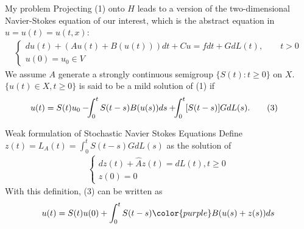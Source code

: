 \documentclass[xcolor=dvipsnames,leqno]{beamer}
\begin{document}
\begin{frame}{My problem}  
Projecting (1) onto $H$ leads to a version of the two-dimensional Navier-Stokes equation of our interest, which is the abstract equation in $u=u(t)=u(t,x)$:
	\begin{align*}\tag{2}%
			\begin{cases}
		        du(t)+(Au(t)+B(u(t)))dt+Cu=fdt+GdL(t), \qquad t>0\\
				u(0)=u_0\in V%
			\end{cases}
	\end{align*}  
We assume $A$ generate a strongly continuous semigroup $\{S(t): t\geq 0\}$ on $X$.  $\{u(t)\in X,t\geq 0\}$ is said to be a mild solution of (1) if
		\begin{align*}
			u(t)&=S(t)u_0-\hspace{-0.15cm}\int_{0}^{t} S(t-s)B(u(s))ds+\hspace{-0.15cm}\int_{0}^{t}[S(t-s)]GdL(s).\tag{3}
		\end{align*}
\end{frame} 
\begin{frame}{Weak formulation of Stochastic Navier Stokes Equations}
	Define $z(t)=L_A(t)=\int_{0}^t S(t-s)GdL(s)$ as the solution of
	\begin{align*}
		\begin{cases}
			dz(t)+\hat{A}z(t)=dL(t), t\geq 0\\
			z(0)=0
		\end{cases}
	\end{align*}
With this definition, (3) can be written as
\begin{align*}
	u(t)=S(t)u(0)+\int_{0}^{t}S(t-s){\color{purple}B}(u(s)+z(s))ds
\end{align*}
\end{frame}
\end{document}
